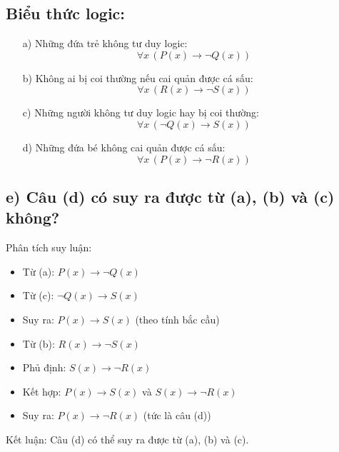 \documentclass[11pt, oneside,openright,a4paper]{book}
\begin{document}
\subsection*{Biểu thức logic:}

\begin{itemize}
    \item[a)] Những đứa trẻ không tư duy logic:
    \[
    \forall x \, (P(x) \rightarrow \neg Q(x))
    \]

    \item[b)] Không ai bị coi thường nếu cai quản được cá sấu:
    \[
    \forall x \, (R(x) \rightarrow \neg S(x))
    \]

    \item[c)] Những người không tư duy logic hay bị coi thường:
    \[
    \forall x \, (\neg Q(x) \rightarrow S(x))
    \]

    \item[d)] Những đứa bé không cai quản được cá sấu:
    \[
    \forall x \, (P(x) \rightarrow \neg R(x))
    \]
\end{itemize}

\subsection*{e) Câu (d) có suy ra được từ (a), (b) và (c) không?}

Phân tích suy luận:

\begin{itemize}
    \item Từ (a): $P(x) \rightarrow \neg Q(x)$
    \item Từ (c): $\neg Q(x) \rightarrow S(x)$
    \item Suy ra: $P(x) \rightarrow S(x)$ \quad (theo tính bắc cầu)

    \item Từ (b): $R(x) \rightarrow \neg S(x)$
    \item Phủ định: $S(x) \rightarrow \neg R(x)$

    \item Kết hợp: $P(x) \rightarrow S(x)$ và $S(x) \rightarrow \neg R(x)$
    \item Suy ra: $P(x) \rightarrow \neg R(x)$ \quad (tức là câu (d))
\end{itemize}

Kết luận: Câu (d) có thể suy ra được từ (a), (b) và (c).
\end{document}

